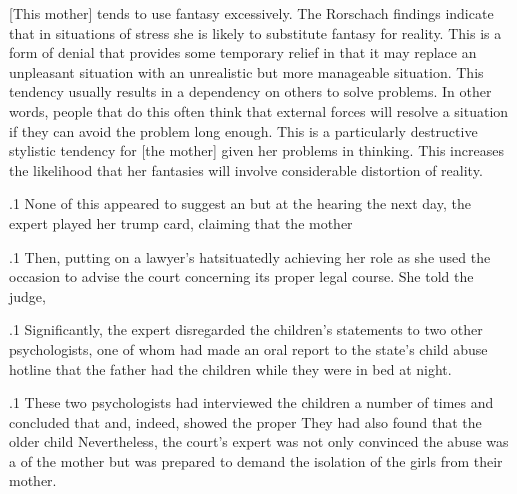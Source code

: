 \documentclass[11pt, twoside]{article}
\begin{document}
{{\begin{blockQuote}
{[This mother]} tends to use fantasy excessively. The Rorschach findings indicate that in situations of stress she is likely to 
substitute fantasy for reality. This is a form of denial that provides
some temporary relief in that it may replace an unpleasant situation
with an unrealistic but more manageable situation. This tendency
usually results in a dependency on others to solve problems. In
other words, people that do this often think that external forces
will resolve a situation if they can avoid the problem long enough.
This is a particularly destructive stylistic tendency for [the mother]
given her problems in thinking. This increases the likelihood that
her fantasies will involve considerable distortion of reality.
\end{blockQuote}

}%

\p.1{%
None of this appeared to suggest an \mdash{}but at the hearing
the next day, the expert played her trump card, claiming that the mother
}%

\p.1{%
Then, putting on a lawyer’s hat\mdash{}situatedly achieving her role as
\mdash{}she used the occasion to advise the court
concerning its proper legal course. She told the judge, 
}%

\p.1{%
Significantly, the expert disregarded the children’s statements to two
other psychologists, one of whom had made an oral report to the state’s
child abuse hotline that the father had  the children while they
were in bed at night.
}%

\p.1{%
These two psychologists had interviewed the children a number of
times and concluded that  and, indeed, showed the proper  They had also found that the older child  Nevertheless, the court’s expert was not only convinced the
abuse was a  of the mother but was prepared to demand the
isolation of the girls from their mother.
}%

}
\end{document}

